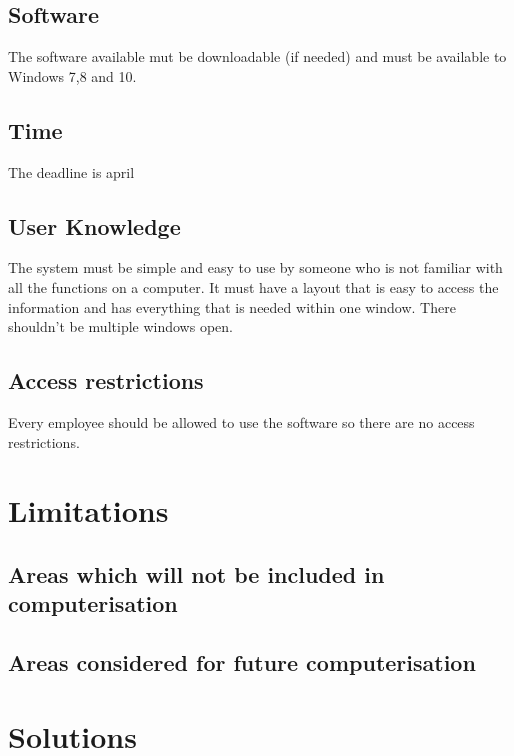 \subsection{Software}
The software available mut be downloadable (if needed) and must be available to Windows 7,8 and 10.
\subsection{Time}
The deadline is april
\subsection{User Knowledge}
The system must be simple and easy to use by someone who is not familiar with all the functions on a computer. It must have a layout that is easy to access the information and has everything that is needed within one window. There shouldn't be multiple windows open.
\subsection{Access restrictions}
Every employee should be allowed to use the software so there are no access restrictions.

\section{Limitations}

\subsection{Areas which will not be included in computerisation}

\subsection{Areas considered for future computerisation}

\section{Solutions}

